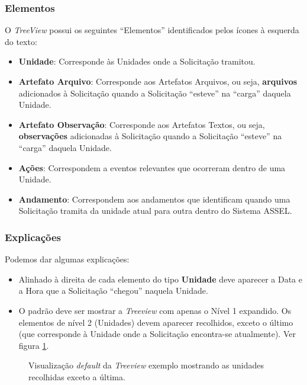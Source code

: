 	\subsubsection{Elementos}
	
	 O \emph{TreeView} possui os seguintes ``Elementos'' identificados pelos ícones à esquerda do texto:
	 
	 \begin{itemize}
	 	\item \textbf{\msUnd Unidade}: Corresponde às Unidades onde a Solicitação tramitou.
	 	\item \textbf{\msArt Artefato Arquivo}: Corresponde aos Artefatos Arquivos, ou seja, \textbf{arquivos} adicionados à Solicitação quando a Solicitação ``esteve'' na ``carga'' daquela Unidade.

	 	\item \textbf{\msObs Artefato Observação}: Corresponde aos Artefatos Textos, ou seja, \textbf{observações} adicionadas à Solicitação quando a Solicitação ``esteve'' na ``carga'' daquela Unidade.

	 	\item \textbf{\msAct Ações}: Correspondem a eventos relevantes que ocorreram dentro de uma Unidade.
		\item \textbf{\msAnd Andamento}: Correspondem aos andamentos que identificam quando uma Solicitação tramita da unidade atual para outra dentro do Sistema ASSEL.   
	 \end{itemize}

	\subsubsection{Explicações}
	
	Podemos dar algumas explicações:
	
	\begin{itemize}
		\item Alinhado à direita de cada elemento do tipo \msUnd \textbf{Unidade} deve aparecer a Data e a Hora que a Solicitação ``chegou'' naquela Unidade.
		
		\item O padrão deve ser mostrar a \emph{Treeview} com apenas o Nível 1 expandido. Os elementos de nível 2 (Unidades) devem aparecer recolhidos, exceto o último (que corresponde à Unidade onde a Solicitação encontra-se atualmente). Ver figura \ref{tree:ex3}.
	\end{itemize}
 
    \begin{figure}[htbp!]
	\caption{Visualização \emph{default} da \emph{Treeview} exemplo mostrando as unidades recolhidas exceto a última.}
	\label{tree:ex3}
	\end{figure}	
	 
